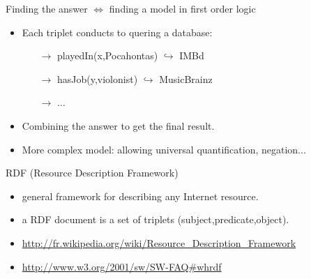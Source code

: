 \documentclass[10pt]{beamer}
\begin{document}
\begin{frame}

	\begin{center}
		Finding the answer $\Leftrightarrow$ finding a model in first order logic
	\end{center}
	
	\begin{itemize}
		\item Each triplet conducts to quering a database:
				\begin{itemize}
					\item[$\rightarrow$] playedIn(x,Pocahontas) $\hookrightarrow$ IMBd
					\item[$\rightarrow$] hasJob(y,violonist) $\hookrightarrow$ MusicBrainz
					\item[$\rightarrow$] $\dots$
				\end{itemize}
		\item Combining the answer to get the final result.
		\item More complex model: allowing universal quantification, negation...
	\end{itemize}

\end{frame}


\begin{frame}

\begin{exampleblock}{RDF (Resource Description Framework)}
	\begin{itemize}
		\item general framework for describing any Internet resource.
		\item a RDF document is a set of triplets (subject,predicate,object).
		\item \url{http://fr.wikipedia.org/wiki/Resource_Description_Framework}
		\item \url{http://www.w3.org/2001/sw/SW-FAQ\#whrdf}
	\end{itemize}
\end{exampleblock}

		
\end{frame}
\end{document}
